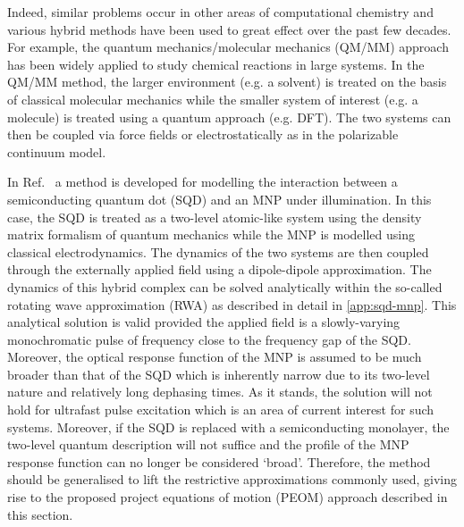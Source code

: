 Indeed, similar problems occur in other areas of computational chemistry and
various hybrid methods have been used to great effect over the past few
decades. For example, the quantum mechanics/molecular mechanics (QM/MM)
approach has been widely applied to study chemical reactions in large systems.
In the QM/MM method, the larger environment (e.g. a solvent) is treated on the
basis of classical molecular mechanics while the smaller system of interest
(e.g. a molecule) is treated using a quantum approach (e.g. DFT). The two
systems can then be coupled via force fields or electrostatically as in the
polarizable continuum model.

In Ref.~\cite{Zhang2006} a method is developed for modelling the interaction
between a semiconducting quantum dot (SQD) and an MNP under illumination. In
this case, the SQD is treated as a two-level atomic-like system using the
density matrix formalism of quantum mechanics while the MNP is modelled using
classical electrodynamics. The dynamics of the two systems are then coupled
through the externally applied field using a dipole-dipole approximation. The
dynamics of this hybrid complex can be solved analytically within the so-called
rotating wave approximation (RWA) as described in detail in \cref{app:sqd-mnp}. This
analytical solution is valid provided the applied field is a slowly-varying
monochromatic pulse of frequency close to the frequency gap of the SQD.
Moreover, the optical response function of the MNP is assumed to be much
broader than that of the SQD which is inherently narrow due to its two-level
nature and relatively long dephasing times. As it stands, the solution will not
hold for ultrafast pulse excitation which is an area of current interest for
such systems. Moreover, if the SQD is replaced with a semiconducting monolayer,
the two-level quantum description will not suffice and the profile of the
MNP response function can no longer be considered `broad'. Therefore, the method
should be generalised to lift the restrictive approximations commonly used,
giving rise to the proposed project equations of motion (PEOM) approach
described in this section. 

